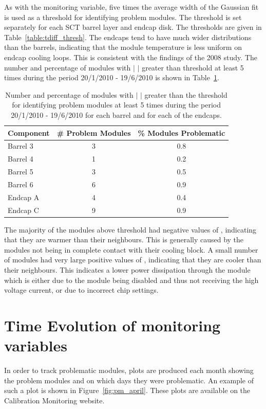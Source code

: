 As with the \deltat monitoring variable, five times the average width of the
Gaussian fit is used as a threshold for identifying problem modules. The
threshold is set separately for each SCT barrel layer and endcap disk. The
thresholds are given in Table~\ref{table:tdiff_thresh}. The endcaps tend to have much wider distributions than the barrels, indicating that the module temperature is less uniform on endcap cooling loops. This is consistent with the findings of the 2008 study. The number and percentage of modules with $|$ \tdiff$|$ greater than threshold at least 5 times during the period 20/1/2010 - 19/6/2010 is shown in Table~\ref{table:tdiff_num}.

\begin{table}
 \centering
\begin{tabular}{  l | c | c }
\hline\hline
Component & \# Problem Modules & \% Modules Problematic \\
\hline
Barrel 3 & 3 & 0.8 \\
Barrel 4 & 1 & 0.2 \\
Barrel 5 & 3 & 0.5 \\
Barrel 6 & 6 & 0.9 \\
Endcap A & 4 & 0.4 \\
Endcap C & 9 & 0.9 \\
\hline\hline
 \end{tabular}
\caption{Number and percentage of modules with $|$ \tdiff$|$ greater than the threshold for identifying problem modules at least 5 times during the period 20/1/2010 - 19/6/2010 for each barrel and for each of the endcaps.}
\label{table:tdiff_num}
\end{table}

The majority of the modules above threshold had negative values of \tdiff,
indicating that they are warmer than their neighbours. This is generally caused by the modules not being in complete contact with their cooling block. A small number of modules had very large positive values of \tdiff, indicating that they are cooler than their neighbours. This indicates a lower power dissipation through the module which is either due to the module being disabled and thus not receiving the high voltage current, or due to incorrect chip settings.

\section{Time Evolution of monitoring variables}

In order to track problematic modules, plots are produced each month showing the problem modules and on which days they were problematic. An example of such a plot is shown in Figure~\ref{fig:pm_april}. These plots are available on the Calibration Monitoring website.

